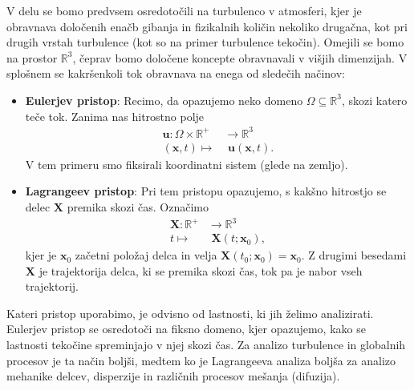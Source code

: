 \documentclass[mat2, tisk]{fmfdelo}
\newcommand{\R}{\mathbb R}
\newcommand{\bd}{\textbf}
\begin{document}
V delu se bomo predvsem osredotočili na turbulenco v atmosferi, kjer je obravnava določenih enačb
gibanja in fizikalnih količin nekoliko drugačna, kot pri drugih vrstah turbulence (kot so na primer turbulence tekočin).
Omejili se bomo na prostor $\R^3$, čeprav bomo določene koncepte 
obravnavali v višjih dimenzijah.
V splošnem se kakršenkoli tok obravnava na enega od sledečih načinov:
\begin{itemize}
  \item \textbf{Eulerjev pristop}: Recimo, da opazujemo neko domeno $\Omega \subseteq \R^3$, skozi katero teče tok.
  Zanima nas hitrostno polje 
  \begin{align*}
  \textbf{u}: \Omega \times \R^+ &\rightarrow \R^3 \\
  (\bd{x},t) \mapsto&\,\, \textbf{u}(\bd{x},t).
  \end{align*}
  V tem primeru smo fiksirali koordinatni
  sistem (glede na zemljo).
  \item \textbf{Lagrangeev pristop}: Pri tem pristopu opazujemo, s kakšno hitrostjo se delec 
  $\bd{X}$ premika skozi čas. Označimo 
  \begin{align*}
    \bd{X}: \R^+& \rightarrow \R^3 \\
    t \mapsto&\,\, \bd{X}(t; \bd{x}_0),
  \end{align*}
  kjer je $\bd{x}_0$ začetni položaj delca in 
  velja $\bd{X}(t_0; \bd{x}_0) = \bd{x}_0$.  
  Z drugimi besedami $\bd{X}$ je trajektorija delca, ki se premika skozi čas, tok pa je nabor vseh trajektorij.
\end{itemize}

Kateri pristop uporabimo, je odvisno od lastnosti, ki jih želimo analizirati. Eulerjev pristop
se osredotoči na fiksno domeno, kjer opazujemo, kako se lastnosti tekočine spreminjajo v njej skozi čas. 
Za analizo turbulence in globalnih procesov je ta način boljši, medtem ko je Lagrangeeva analiza 
boljša za analizo mehanike delcev, disperzije in različnih procesov mešanja (difuzija). 
\end{document}
